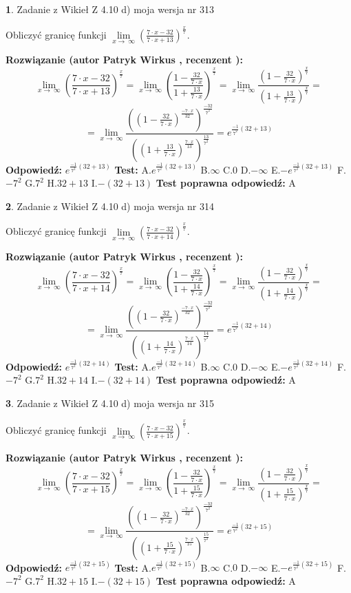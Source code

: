 \documentclass[12pt, a4paper]{article}
\theoremstyle{definition} %
\newtheorem{zad}{}
\newcommand{\zadStart}[1]{\begin{zad}#1\newline}
\newcommand{\zadStop}{\end{zad}}
\newcommand{\rozwStart}[2]{\noindent \textbf{Rozwiązanie (autor #1 , recenzent #2): }\newline}
\newcommand{\rozwStop}{\newline}
\newcommand{\odpStart}{\noindent \textbf{Odpowiedź:}\newline}
\newcommand{\odpStop}{\newline}
\newcommand{\testStart}{\noindent \textbf{Test:}\newline}
\newcommand{\testStop}{\newline}
\newcommand{\kluczStart}{\noindent \textbf{Test poprawna odpowiedź:}\newline}
\newcommand{\kluczStop}{\newline}
\begin{document}
\zadStart{Zadanie z Wikieł Z 4.10 d) moja wersja nr 313}


Obliczyć granicę funkcji  $\lim\limits_{x\to\ \infty}(\frac{7\cdot x-32}{7\cdot x+13})^{\frac{x}{7}}$.
\zadStop
\rozwStart{Patryk Wirkus}{}
$$\lim\limits_{x\to\ \infty}(\frac{7\cdot x-32}{7\cdot x+13})^{\frac{x}{7}} = \lim\limits_{x\to\ \infty}(\frac{1-\frac{32}{7\cdot x}}{1+\frac{13}{7\cdot x}})^{\frac{x}{7}}=\lim\limits_{x\to\ \infty}\frac{(1-\frac{32}{7\cdot x})^{\frac{x}{7}}}{(1+\frac{13}{7\cdot x})^{\frac{x}{7}}}=$$
$$=\lim\limits_{x\to\ \infty}\frac{((1-\frac{32}{7\cdot x})^{\frac{-7\cdot x}{32}})^{\frac{-32}{7^{2}}}}{((1+\frac{13}{7\cdot x})^{\frac{7\cdot x}{13}})^{\frac{13}{7^{2}}}}=e^{\frac{-1}{7^{2}}(32+13)}$$
\rozwStop
\odpStart
$e^{\frac{-1}{7^{2}}(32+13)}$
\odpStop
\testStart
A.$e^{\frac{-1}{7^{2}}(32+13)}$ B.$\infty$ C.$0$ D.$-\infty$ E.$-e^{\frac{-1}{7^{2}}(32+13)}$
F.$-7^{2}$ G.$7^{2}$
H.$32+13$
I.$-(32+13)$
\testStop
\kluczStart
A
\kluczStop



\zadStart{Zadanie z Wikieł Z 4.10 d) moja wersja nr 314}


Obliczyć granicę funkcji  $\lim\limits_{x\to\ \infty}(\frac{7\cdot x-32}{7\cdot x+14})^{\frac{x}{7}}$.
\zadStop
\rozwStart{Patryk Wirkus}{}
$$\lim\limits_{x\to\ \infty}(\frac{7\cdot x-32}{7\cdot x+14})^{\frac{x}{7}} = \lim\limits_{x\to\ \infty}(\frac{1-\frac{32}{7\cdot x}}{1+\frac{14}{7\cdot x}})^{\frac{x}{7}}=\lim\limits_{x\to\ \infty}\frac{(1-\frac{32}{7\cdot x})^{\frac{x}{7}}}{(1+\frac{14}{7\cdot x})^{\frac{x}{7}}}=$$
$$=\lim\limits_{x\to\ \infty}\frac{((1-\frac{32}{7\cdot x})^{\frac{-7\cdot x}{32}})^{\frac{-32}{7^{2}}}}{((1+\frac{14}{7\cdot x})^{\frac{7\cdot x}{14}})^{\frac{14}{7^{2}}}}=e^{\frac{-1}{7^{2}}(32+14)}$$
\rozwStop
\odpStart
$e^{\frac{-1}{7^{2}}(32+14)}$
\odpStop
\testStart
A.$e^{\frac{-1}{7^{2}}(32+14)}$ B.$\infty$ C.$0$ D.$-\infty$ E.$-e^{\frac{-1}{7^{2}}(32+14)}$
F.$-7^{2}$ G.$7^{2}$
H.$32+14$
I.$-(32+14)$
\testStop
\kluczStart
A
\kluczStop



\zadStart{Zadanie z Wikieł Z 4.10 d) moja wersja nr 315}


Obliczyć granicę funkcji  $\lim\limits_{x\to\ \infty}(\frac{7\cdot x-32}{7\cdot x+15})^{\frac{x}{7}}$.
\zadStop
\rozwStart{Patryk Wirkus}{}
$$\lim\limits_{x\to\ \infty}(\frac{7\cdot x-32}{7\cdot x+15})^{\frac{x}{7}} = \lim\limits_{x\to\ \infty}(\frac{1-\frac{32}{7\cdot x}}{1+\frac{15}{7\cdot x}})^{\frac{x}{7}}=\lim\limits_{x\to\ \infty}\frac{(1-\frac{32}{7\cdot x})^{\frac{x}{7}}}{(1+\frac{15}{7\cdot x})^{\frac{x}{7}}}=$$
$$=\lim\limits_{x\to\ \infty}\frac{((1-\frac{32}{7\cdot x})^{\frac{-7\cdot x}{32}})^{\frac{-32}{7^{2}}}}{((1+\frac{15}{7\cdot x})^{\frac{7\cdot x}{15}})^{\frac{15}{7^{2}}}}=e^{\frac{-1}{7^{2}}(32+15)}$$
\rozwStop
\odpStart
$e^{\frac{-1}{7^{2}}(32+15)}$
\odpStop
\testStart
A.$e^{\frac{-1}{7^{2}}(32+15)}$ B.$\infty$ C.$0$ D.$-\infty$ E.$-e^{\frac{-1}{7^{2}}(32+15)}$
F.$-7^{2}$ G.$7^{2}$
H.$32+15$
I.$-(32+15)$
\testStop
\kluczStart
A
\kluczStop
\end{document}

